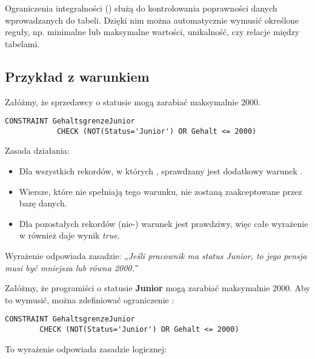     Ograniczenia integralności () służą do kontrolowania poprawności danych 
    wprowadzanych do tabeli. Dzięki nim można automatycznie wymusić określone reguły, 
    np. minimalne lub maksymalne wartości, unikalność, czy relacje między tabelami.

\subsection{Przykład z warunkiem }

    Załóżmy, że sprzedawcy o statusie  mogą zarabiać maksymalnie 2000.

    \begin{lstlisting}[style=sqlstyle]
        CONSTRAINT GehaltsgrenzeJunior
            CHECK (NOT(Status='Junior') OR Gehalt <= 2000)
    \end{lstlisting}

    Zasada działania:
    \begin{itemize}
        \item Dla wszystkich rekordów, w których , 
        sprawdzany jest dodatkowy warunek .
        \item Wiersze, które nie spełniają tego warunku, nie zostaną zaakceptowane przez bazę danych.
        \item Dla pozostałych rekordów (nie-) warunek  jest prawdziwy, 
        więc całe wyrażenie w  również daje wynik \textit{true}.
    \end{itemize}

    Wyrażenie  odpowiada zasadzie:
    \textit{„Jeśli pracownik ma status Junior, to jego pensja musi być mniejsza lub równa 2000.”}


    Załóżmy, że programiści o statusie \textbf{Junior} mogą zarabiać maksymalnie 2000.  
    Aby to wymusić, można zdefiniować ograniczenie :

    \begin{lstlisting}[style=sqlstyle]
    CONSTRAINT GehaltsgrenzeJunior
        CHECK (NOT(Status='Junior') OR Gehalt <= 2000)
    \end{lstlisting}


    To wyrażenie odpowiada zasadzie logicznej:

